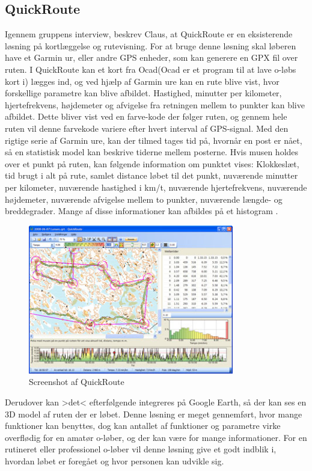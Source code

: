 \subsection{QuickRoute}
Igennem gruppens interview, beskrev Claus, at QuickRoute er en eksisterende løsning på kortlæggelse og rutevisning. For at bruge denne løsning skal løberen have et Garmin ur, eller andre GPS enheder, som kan generere en GPX fil over ruten. I QuickRoute kan et kort fra Ocad(Ocad er et program til at lave o-løbs kort i) lægges ind, og ved hjælp af Garmin ure kan en rute blive vist, hvor forskellige parametre kan blive afbildet. Hastighed, minutter per kilometer, hjertefrekvens, højdemeter og afvigelse fra retningen mellem to punkter kan blive afbildet. Dette bliver vist ved en farve-kode der følger ruten, og gennem hele ruten vil denne farvekode variere efter hvert interval af GPS-signal. Med den rigtige serie af Garmin ure, kan der tilmed tages tid på, hvornår en post er nået, så en statistisk model kan beskrive tiderne mellem posterne. Hvis musen holdes over et punkt på ruten, kan følgende information om punktet vises: Klokkeslæt, tid brugt i alt på rute, samlet distance løbet til det punkt, nuværende minutter per kilometer, nuværende hastighed i km/t, nuværende hjertefrekvens, nuværende højdemeter, nuværende afvigelse mellem to punkter, nuværende længde- og breddegrader. Mange af disse informationer kan afbildes på et histogram \citep{QR}.

\begin{figure}[h]
    \centering
    \includegraphics[width=0.8\textwidth]{billeder/QR}
    \caption{Screenshot af QuickRoute}
\end{figure}

Derudover kan >det< efterfølgende integreres på Google Earth, så der kan ses en 3D model af ruten der er løbet. 
Denne løsning er meget gennemført, hvor mange funktioner kan benyttes, dog kan antallet af funktioner og parametre virke overflødig for en amatør o-løber, og der kan være for mange informationer. For en rutineret eller professionel o-løber vil denne løsning give et godt indblik i, hvordan løbet er foregået og hvor personen kan udvikle sig.


